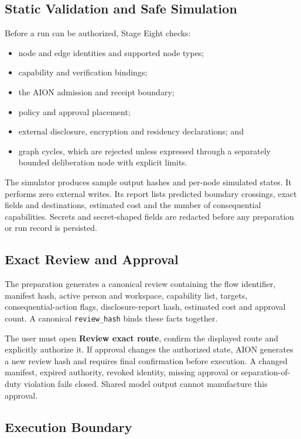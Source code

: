 \subsection{Static Validation and Safe Simulation}

Before a run can be authorized, Stage Eight checks:

\begin{itemize}
  \item node and edge identities and supported node types;
  \item capability and verification bindings;
  \item the AION admission and receipt boundary;
  \item policy and approval placement;
  \item external disclosure, encryption and residency declarations; and
  \item graph cycles, which are rejected unless expressed through a separately bounded deliberation
        node with explicit limits.
\end{itemize}

The simulator produces sample output hashes and per-node simulated states.  It performs zero
external writes.  Its report lists predicted boundary crossings, exact fields and destinations,
estimated cost and the number of consequential capabilities.  Secrets and secret-shaped fields are
redacted before any preparation or run record is persisted.

\subsection{Exact Review and Approval}

The preparation generates a canonical review containing the flow identifier, manifest hash, active
person and workspace, capability list, targets, consequential-action flags, disclosure-report hash,
estimated cost and approval count.  A canonical \texttt{review\_hash} binds these facts together.

The user must open \textbf{Review exact route}, confirm the displayed route and explicitly authorize
it.  If approval changes the authorized state, AION generates a new review hash and requires final
confirmation before execution.  A changed manifest, expired authority, revoked identity, missing
approval or separation-of-duty violation fails closed.  Shared model output cannot manufacture this
approval.

\subsection{Execution Boundary}

